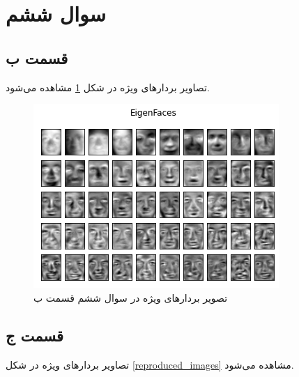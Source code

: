 \documentclass{article}
\begin{document}
\section*{سوال ششم}

\subsection*{قسمت ب}

تصاویر بردار‌های ویژه در شکل \ref{eigenfaces} مشاهده می‌شود.

\begin{figure}[h]
    \centering
    \includegraphics{images/q6/eigenfaces.png}
    \caption{تصویر بردار‌های ویژه در سوال ششم قسمت ب}
    \label{eigenfaces}
\end{figure}

\subsection*{قسمت ج}

تصاویر بردار‌های ویژه در شکل \ref{reproduced_images} مشاهده می‌شود.
\end{document}
